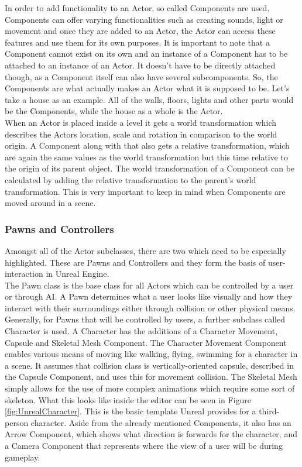 In order to add functionality to an Actor, so called Components are used\cite{bib:UEComponents}. Components can offer varying functionalities such as creating sounds, light or movement and once they are added to an Actor, the Actor can access these features and use them for its own purposes. It is important to note that a Component cannot exist on its own and an instance of a Component has to be attached to an instance of an Actor. It doesn't have to be directly attached though, as a Component itself can also have several subcomponents. So, the Components are what actually makes an Actor what it is supposed to be. Let's take a house as an example. All of the walls, floors, lights and other parts would be the Components, while the house as a whole is the Actor.\\

When an Actor is placed inside a level it gets a world transformation which describes the Actors location, scale and rotation in comparison to the world origin. A Component along with that also gets a relative transformation, which are again the same values as the world transformation but this time relative to the origin of its parent object. The world transformation of a Component can be calculated by adding the relative transformation to the parent's world transformation. This is very important to keep in mind when Components are moved around in a scene. 

\subsubsection{Pawns and Controllers}
Amongst all of the Actor subclasses, there are two which need to be especially highlighted. These are Pawns and Controllers and they form the basis of user-interaction in Unreal Engine.\\
The Pawn class is the base class for all Actors which can be controlled by a user or through \acs{AI}\cite{bib:UEPawn}. A Pawn determines what a user looks like visually and how they interact with their surroundings either through collision or other physical means. Generally, for Pawns that will be controlled by users, a further subclass called Character is used\cite{bib:UECharacter}. A Character has the additions of a Character Movement, Capsule and Skeletal Mesh Component. The Character Movement Component enables various means of moving like walking, flying, swimming for a character in a scene. It assumes that collision class is vertically-oriented capsule, described in the Capsule Component, and uses this for movement collision. The Skeletal Mesh simply allows for the use of more complex animations which require some sort of skeleton. What this looks like inside the editor can be seen in Figure \ref{fig:UnrealCharacter}. This is the basic template Unreal provides for a third-person character. Aside from the already mentioned Components, it also has an Arrow Component, which shows what direction is forwards for the character, and a Camera Component that represents where the view of a user will be during gameplay.\\

